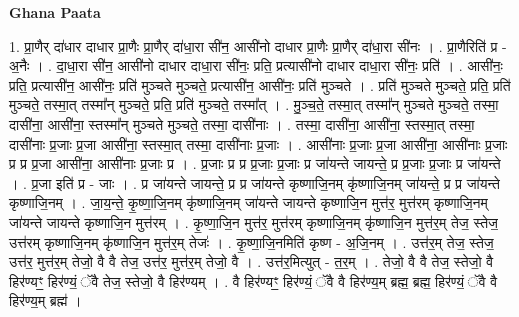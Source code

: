 \documentclass[17pt]{extarticle}
\begin{document}
\textbf{Ghana Paata } \newline

1. प्रा॒णैर् दा॑धार दाधार प्रा॒णैः प्रा॒णैर् दा॑धा॒रा सी॑न॒ आसी॑नो दाधार प्रा॒णैः प्रा॒णैर् दा॑धा॒रा सी॑नः । . प्रा॒णैरिति॑ प्र - अ॒नैः । . दा॒धा॒रा सी॑न॒ आसी॑नो दाधार दाधा॒रा सी॑नः॒ प्रति॒ प्रत्यासी॑नो दाधार दाधा॒रा सी॑नः॒ प्रति॑ । . आसी॑नः॒ प्रति॒ प्रत्यासी॑न॒ आसी॑नः॒ प्रति॑ मुञ्चते मुञ्चते॒ प्रत्यासी॑न॒ आसी॑नः॒ प्रति॑ मुञ्चते । . प्रति॑ मुञ्चते मुञ्चते॒ प्रति॒ प्रति॑ मुञ्चते॒ तस्मा॒त् तस्मा᳚न् मुञ्चते॒ प्रति॒ प्रति॑ मुञ्चते॒ तस्मा᳚त् । . मु॒ञ्च॒ते॒ तस्मा॒त् तस्मा᳚न् मुञ्चते मुञ्चते॒ तस्मा॒ दासी॑ना॒ आसी॑ना॒ स्तस्मा᳚न् मुञ्चते मुञ्चते॒ तस्मा॒ दासी॑नाः । . तस्मा॒ दासी॑ना॒ आसी॑ना॒ स्तस्मा॒त् तस्मा॒ दासी॑नाः प्र॒जाः प्र॒जा आसी॑ना॒ स्तस्मा॒त् तस्मा॒ दासी॑नाः प्र॒जाः । . आसी॑नाः प्र॒जाः प्र॒जा आसी॑ना॒ आसी॑नाः प्र॒जाः प्र प्र प्र॒जा आसी॑ना॒ आसी॑नाः प्र॒जाः प्र । . प्र॒जाः प्र प्र प्र॒जाः प्र॒जाः प्र जा॑यन्ते जायन्ते॒ प्र प्र॒जाः प्र॒जाः प्र जा॑यन्ते । . प्र॒जा इति॑ प्र - जाः । . प्र जा॑यन्ते जायन्ते॒ प्र प्र जा॑यन्ते कृष्णाजि॒नम् कृ॑ष्णाजि॒नम् जा॑यन्ते॒ प्र प्र जा॑यन्ते कृष्णाजि॒नम् । . जा॒य॒न्ते॒ कृ॒ष्णा॒जि॒नम् कृ॑ष्णाजि॒नम् जा॑यन्ते जायन्ते कृष्णाजि॒न मुत्त॑र॒ मुत्त॑रम् कृष्णाजि॒नम् जा॑यन्ते जायन्ते कृष्णाजि॒न मुत्त॑रम् । . कृ॒ष्णा॒जि॒न मुत्त॑र॒ मुत्त॑रम् कृष्णाजि॒नम् कृ॑ष्णाजि॒न मुत्त॑र॒म् तेज॒ स्तेज॒ उत्त॑रम् कृष्णाजि॒नम् कृ॑ष्णाजि॒न मुत्त॑र॒म् तेजः॑ । . कृ॒ष्णा॒जि॒नमिति॑ कृष्ण - अ॒जि॒नम् । . उत्त॑र॒म् तेज॒ स्तेज॒ उत्त॑र॒ मुत्त॑र॒म् तेजो॒ वै वै तेज॒ उत्त॑र॒ मुत्त॑र॒म् तेजो॒ वै । . उत्त॑र॒मित्युत् - त॒र॒म् । . तेजो॒ वै वै तेज॒ स्तेजो॒ वै हिर॑ण्यꣳ॒॒ हिर॑ण्यं॒ ॅवै तेज॒ स्तेजो॒ वै हिर॑ण्यम् । . वै हिर॑ण्यꣳ॒॒ हिर॑ण्यं॒ ॅवै वै हिर॑ण्य॒म् ब्रह्म॒ ब्रह्म॒ हिर॑ण्यं॒ ॅवै वै हिर॑ण्य॒म् ब्रह्म॑ । \newline
\end{document}
